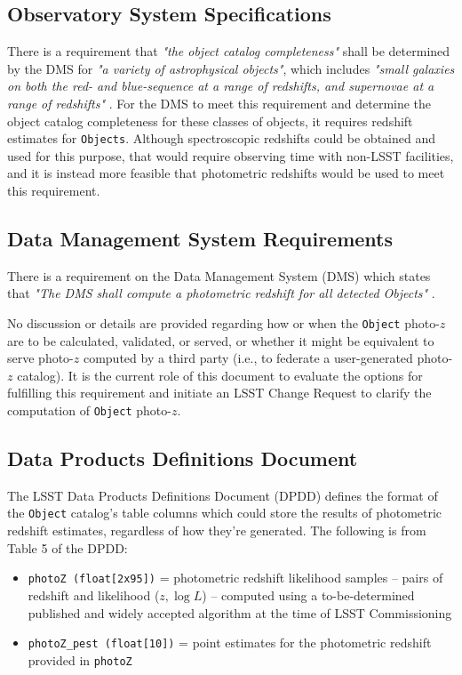 \documentclass[DM,lsstdraft,toc]{lsstdoc}
\begin{document}
\subsection{Observatory System Specifications}\label{ssec:docs_oss}

There is a requirement that {\it "the object catalog completeness"} shall be determined by the DMS for {\it "a variety of astrophysical objects"}, which includes {\it "small galaxies on both the red- and blue-sequence at a range of redshifts, and supernovae at a range of redshifts"} . 
For the DMS to meet this requirement and determine the object catalog completeness for these classes of objects, it requires redshift estimates for {\tt Objects}.
Although spectroscopic redshifts could be obtained and used for this purpose, that would require observing time with non-LSST facilities, and it is instead more feasible that photometric redshifts would be used to meet this requirement.

\subsection{Data Management System Requirements}\label{ssec:docs_dmsr}

There is a requirement on the Data Management System (DMS) which states that {\it "The DMS shall compute a photometric redshift for all detected Objects"} . 

No discussion or details are provided regarding how or when the {\tt Object} photo-$z$ are to be calculated, validated, or served, or whether it might be equivalent to serve photo-$z$ computed by a third party (i.e., to federate a user-generated photo-$z$ catalog).
It is the current role of this document to evaluate the options for fulfilling this requirement and initiate an LSST Change Request to clarify the computation of {\tt Object} photo-$z$.

\subsection{Data Products Definitions Document}\label{ssec:docs_dpdd}

The LSST Data Products Definitions Document (DPDD)  defines the format of the {\tt Object} catalog's table columns which could store the results of photometric redshift estimates, regardless of how they're generated. 
The following is from Table 5 of the DPDD:
\vspace{-15pt}
\begin{itemize}
\item \texttt{photoZ (float[2x95])} = photometric redshift likelihood samples -- pairs of redshift and likelihood ($z,\log{L}$) -- computed using a to-be-determined published and widely accepted algorithm at the time of LSST Commissioning
\item \texttt{photoZ\_pest (float[10])} = point estimates for the photometric redshift provided in {\tt photoZ}
\end{itemize}
\end{document}
